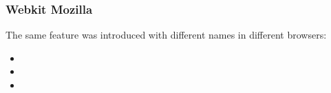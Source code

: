 \begin{frame}[fragile]
\frametitle{Webkit Mozilla}
\color{structure}
The same feature was introduced with different names in different browsers:
\begin{itemize}\color{structure}
  \item {}
  \item {}
  \item {}
\end{itemize}
\end{frame}

